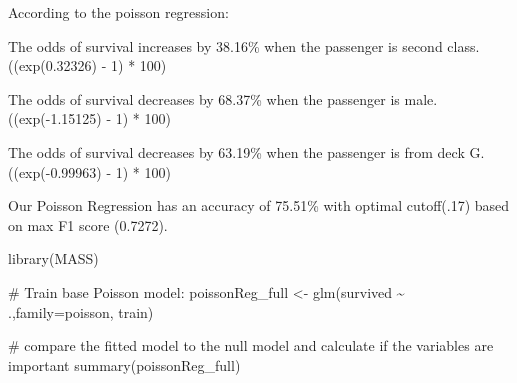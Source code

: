 \documentclass[
  letterpaper,
  DIV=11,
  numbers=noendperiod]{scrartcl}
\newenvironment{Shaded}{\begin{snugshade}}{\end{snugshade}}
\newcommand{\AttributeTok}[1]{\textcolor[rgb]{0.40,0.45,0.13}{#1}}
\newcommand{\CommentTok}[1]{\textcolor[rgb]{0.37,0.37,0.37}{#1}}
\newcommand{\FunctionTok}[1]{\textcolor[rgb]{0.28,0.35,0.67}{#1}}
\newcommand{\NormalTok}[1]{\textcolor[rgb]{0.00,0.23,0.31}{#1}}
\newcommand{\OtherTok}[1]{\textcolor[rgb]{0.00,0.23,0.31}{#1}}
\newcommand{\SpecialCharTok}[1]{\textcolor[rgb]{0.37,0.37,0.37}{#1}}
\begin{document}
According to the poisson regression:

\par

The odds of survival increases by 38.16\% when the passenger is second
class. ((exp(0.32326) - 1) * 100)

\par

The odds of survival decreases by 68.37\% when the passenger is male.
((exp(-1.15125) - 1) * 100)

\par

The odds of survival decreases by 63.19\% when the passenger is from
deck G. ((exp(-0.99963) - 1) * 100)

\par

Our Poisson Regression has an accuracy of 75.51\% with optimal
cutoﬀ(.17) based on max F1 score (0.7272).

\begin{Shaded}
\begin{Highlighting}[]
\FunctionTok{library}\NormalTok{(MASS)}

\CommentTok{\# Train base Poisson model:}
\NormalTok{poissonReg\_full }\OtherTok{\textless{}{-}} \FunctionTok{glm}\NormalTok{(survived }\SpecialCharTok{\textasciitilde{}}\NormalTok{ .,}\AttributeTok{family=}\NormalTok{poisson, train)}

\CommentTok{\# compare the fitted model to the null model and calculate if the variables are important}
\FunctionTok{summary}\NormalTok{(poissonReg\_full)}
\end{Highlighting}
\end{Shaded}
\end{document}
